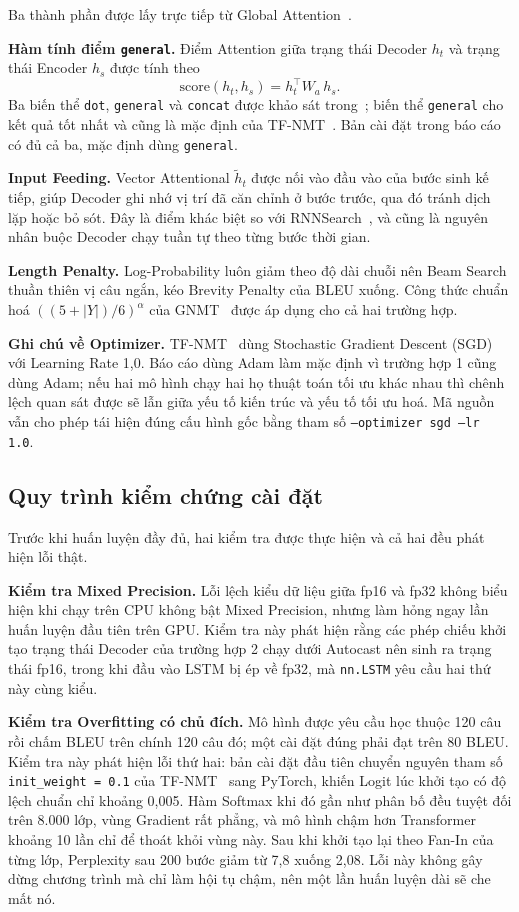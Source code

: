 \documentclass[11pt,a4paper]{article}
\newcommand{\file}[1]{\texttt{\small #1}}
\begin{document}
Ba thành phần được lấy trực tiếp từ Global Attention~\cite{luong2015emnlp}.

\textbf{Hàm tính điểm \file{general}.} Điểm Attention giữa trạng thái Decoder
$h_t$ và trạng thái Encoder $h_s$ được tính theo
\[
\text{score}(h_t, h_s) = h_t^{\top} W_a\, h_s .
\]
Ba biến thể \file{dot}, \file{general} và \file{concat} được khảo sát
trong~\cite{luong2015emnlp}; biến thể \file{general} cho kết quả tốt nhất và
cũng là mặc định của TF-NMT~\cite{tfnmt}. Bản cài đặt trong báo cáo có đủ cả ba,
mặc định dùng \file{general}.

\textbf{Input Feeding.} Vector Attentional $\tilde{h}_t$ được nối vào đầu vào
của bước sinh kế tiếp, giúp Decoder ghi nhớ vị trí đã căn chỉnh ở bước trước,
qua đó tránh dịch lặp hoặc bỏ sót. Đây là điểm khác biệt so với
RNNSearch~\cite{bahdanau2015}, và cũng là nguyên nhân buộc Decoder chạy tuần tự
theo từng bước thời gian.

\textbf{Length Penalty.} Log-Probability luôn giảm theo độ dài chuỗi nên Beam
Search thuần thiên vị câu ngắn, kéo Brevity Penalty của BLEU xuống. Công thức
chuẩn hoá $((5+|Y|)/6)^{\alpha}$ của GNMT~\cite{wu2016} được áp dụng cho cả hai
trường hợp.

\textbf{Ghi chú về Optimizer.} TF-NMT~\cite{tfnmt} dùng Stochastic Gradient
Descent (SGD) với Learning Rate 1,0. Báo cáo dùng Adam làm mặc định vì trường
hợp 1 cũng dùng Adam; nếu hai mô hình chạy hai họ thuật toán tối ưu khác nhau
thì chênh lệch quan sát được sẽ lẫn giữa yếu tố kiến trúc và yếu tố tối ưu hoá.
Mã nguồn vẫn cho phép tái hiện đúng cấu hình gốc bằng tham số
\file{--optimizer sgd --lr 1.0}.

\subsection{Quy trình kiểm chứng cài đặt}

Trước khi huấn luyện đầy đủ, hai kiểm tra được thực hiện và cả hai đều phát hiện
lỗi thật.

\textbf{Kiểm tra Mixed Precision.} Lỗi lệch kiểu dữ liệu giữa fp16 và fp32 không
biểu hiện khi chạy trên CPU không bật Mixed Precision, nhưng làm hỏng ngay lần
huấn luyện đầu tiên trên GPU. Kiểm tra này phát hiện rằng các phép chiếu khởi
tạo trạng thái Decoder của trường hợp 2 chạy dưới Autocast nên sinh ra trạng
thái fp16, trong khi đầu vào LSTM bị ép về fp32, mà \file{nn.LSTM} yêu cầu hai
thứ này cùng kiểu.

\textbf{Kiểm tra Overfitting có chủ đích.} Mô hình được yêu cầu học thuộc 120
câu rồi chấm BLEU trên chính 120 câu đó; một cài đặt đúng phải đạt trên 80 BLEU.
Kiểm tra này phát hiện lỗi thứ hai: bản cài đặt đầu tiên chuyển nguyên tham số
\file{init\_weight = 0.1} của TF-NMT~\cite{tfnmt} sang PyTorch, khiến Logit lúc
khởi tạo có độ lệch chuẩn chỉ khoảng 0,005. Hàm Softmax khi đó gần như phân bố
đều tuyệt đối trên 8.000 lớp, vùng Gradient rất phẳng, và mô hình chậm hơn
Transformer khoảng 10 lần chỉ để thoát khỏi vùng này. Sau khi khởi tạo lại theo
Fan-In của từng lớp, Perplexity sau 200 bước giảm từ 7,8 xuống 2,08. Lỗi này
không gây dừng chương trình mà chỉ làm hội tụ chậm, nên một lần huấn luyện dài
sẽ che mất nó.
\end{document}
